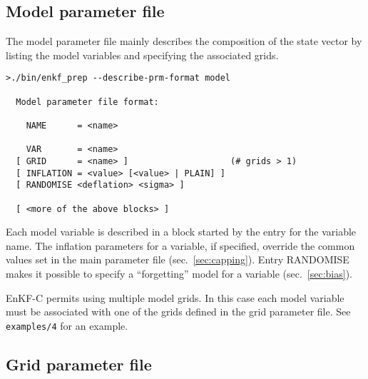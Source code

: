 \documentclass[11pt]{report}
\begin{document}
\subsection{Model parameter file}
\label{sec:modelprm}

The model parameter file mainly describes the composition of the state vector by listing the model variables and specifying the associated grids.

\begin{Verbatim}[frame=single,fontsize=\footnotesize]
>./bin/enkf_prep --describe-prm-format model

  Model parameter file format:

    NAME      = <name>

    VAR       = <name>
  [ GRID      = <name> ]                    (# grids > 1)
  [ INFLATION = <value> [<value> | PLAIN] ]
  [ RANDOMISE <deflation> <sigma> ]

  [ <more of the above blocks> ]
\end{Verbatim}

Each model variable is described in a block started by the entry for the variable name.
The inflation parameters for a variable, if specified, override the common values set in the main parameter file (sec.~\ref{sec:capping}).
Entry RANDOMISE makes it possible to specify a ``forgetting'' model for a variable (sec.~\ref{sec:bias}).

EnKF-C permits using multiple model grids.
In this case each model variable must be associated with one of the grids defined in the grid parameter file.
See \verb|examples/4| for an example.

\subsection{Grid parameter file}
\label{sec:gridprm}
\end{document}

